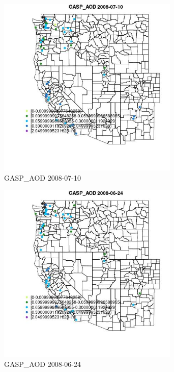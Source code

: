\begin{figure} 
\centering  
\includegraphics[width=0.77\textwidth]{Code_Outputs/Report_ML_input_PM25_Step4_part_e_de_duplicated_aves_MapObsGASP_AOD2008-07-10.jpg} 
\caption{\label{fig:Report_ML_input_PM25_Step4_part_e_de_duplicated_avesMapObsGASP_AOD2008-07-10}GASP_AOD 2008-07-10} 
\end{figure} 
 

\begin{figure} 
\centering  
\includegraphics[width=0.77\textwidth]{Code_Outputs/Report_ML_input_PM25_Step4_part_e_de_duplicated_aves_MapObsGASP_AOD2008-06-24.jpg} 
\caption{\label{fig:Report_ML_input_PM25_Step4_part_e_de_duplicated_avesMapObsGASP_AOD2008-06-24}GASP_AOD 2008-06-24} 
\end{figure} 
 

